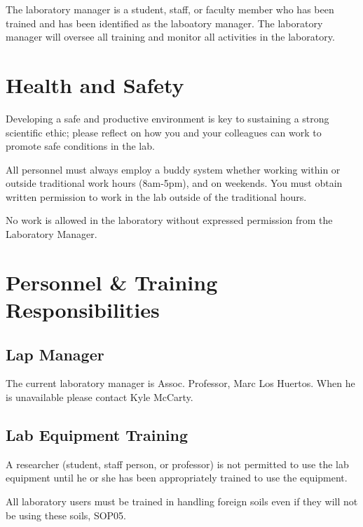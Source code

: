 \documentclass[12pt]{../SOP4_alpha}\usepackage[]{graphicx}\usepackage[]{xcolor}
\begin{document}
\NP The laboratory manager is a student, staff, or faculty member who has been trained and has been identified as the laboatory manager. The laboratory manager will oversee all training and monitor all activities in the laboratory. 


\section{Health and Safety}

\NP Developing a safe and productive environment is key to sustaining a strong scientific ethic; please reflect on how you and your colleagues can work to promote safe conditions in the lab.

\NP All personnel must always employ a buddy system whether working within or outside traditional work hours (8am-5pm), and on weekends. You must obtain written permission to work in the lab outside of the traditional hours.

\NP No work is allowed in the laboratory without expressed permission from the Laboratory Manager.

\section{Personnel \& Training Responsibilities}

\subsection*{Lap Manager}

The current laboratory manager is Assoc. Professor, Marc Los Huertos. When he is unavailable please contact Kyle McCarty. 

\subsection*{Lab Equipment Training}

\NP A researcher (student, staff person, or professor) is not permitted to use the lab equipment until he or she has been appropriately trained to use the equipment.

\NP All laboratory users must be trained in handling foreign soils even if they will not be using these soils, SOP05.
\end{document}
